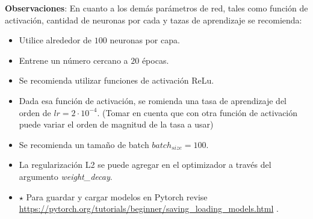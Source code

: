 \documentclass[11pt,letterpaper]{article}
\begin{document}
\begin{enumerate}
\textbf{Observaciones}: En cuanto a los demás parámetros de red, tales como función de activación, cantidad de neuronas por cada y tazas de aprendizaje se recomienda:

\begin{itemize}
    \item Utilice alrededor de $100$ neuronas por capa.
    \item Entrene un número cercano a $20$ épocas.
    \item Se recomienda utilizar funciones de activación ReLu.
    \item Dada esa función de activación, se romienda una tasa de aprendizaje del orden de $lr=2\cdot 10^{-4}$. (Tomar en cuenta que con otra función de activación puede variar el orden de magnitud de la tasa a usar)
    \item Se recomienda un tamaño de batch $batch_{size}=100$.
    \item La regularización L2 se puede agregar en el optimizador a través del argumento \textit{weight\_decay}. 
    \item $\star$ Para guardar y cargar modelos en Pytorch revise \url{https://pytorch.org/tutorials/beginner/saving_loading_models.html} .
\end{itemize}


\end{enumerate}
\end{document}
